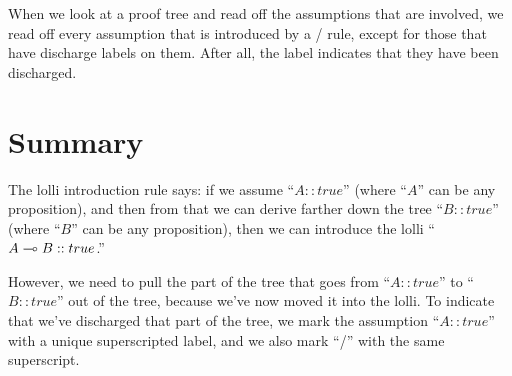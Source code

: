 \documentclass[../../../main.tex]{subfiles}
\begin{document}
When we look at a proof tree and read off the assumptions that are involved, we read off every assumption that is introduced by a \startrule/ rule, except for those that have discharge labels on them. After all, the label indicates that they have been discharged.


\section{Summary}

The lolli introduction rule says: if we assume ``$A :: true$'' (where ``$A$'' can be any proposition), and then from that we can derive farther down the tree ``$B :: true$'' (where ``$B$'' can be any proposition), then we can introduce the lolli ``$A \lolli/ B :: true$.'' 

However, we need to pull the part of the tree that goes from ``$A :: true$'' to ``$B :: true$'' out of the tree, because we've now moved it into the lolli. To indicate that we've discharged that part of the tree, we mark the assumption ``$A :: true$'' with a unique superscripted label, and we also mark ``\lolliIntro/'' with the same superscript.
\end{document}
